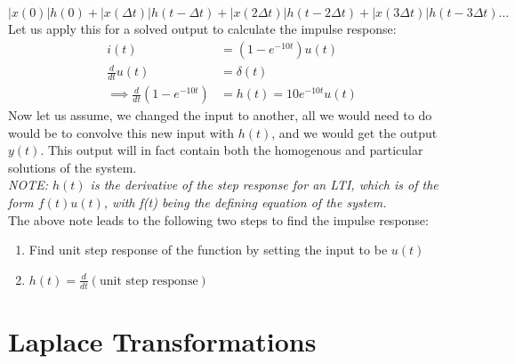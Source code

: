 \documentclass[nobib]{tufte-handout}
\begin{document}
\begin{equation*}
    |x(0)|h(0)+|x(\Delta t)|h(t-\Delta t)+|x(2\Delta t)|h(t-2\Delta t)+|x(3\Delta t)|h(t-3\Delta t)\ldots
\end{equation*}
Let us apply this for a solved output to calculate the impulse response:
\begin{align*}
    i(t)                              & = (1-e^{-10t})u(t)      \\
    \frac{d}{dt}u(t)                  & = \delta(t)             \\
    \implies \frac{d}{dt}(1-e^{-10t}) & = h(t) = 10e^{-10t}u(t)
\end{align*}
Now let us assume, we changed the input to another, all we would need to do would be to convolve this new input with $h(t)$, and we would get the output $y(t)$. This output will in fact contain both the homogenous and particular solutions of the system.\\
\textit{NOTE: $h(t)$ is the derivative of the step response for an LTI, which is of the form $f(t)u(t)$, with f(t) being the defining equation of the system.}\\
The above note leads to the following two steps to find the impulse response:
\begin{enumerate}
    \item Find unit step response of the function by setting the input to be $u(t)$
    \item $h(t) = \frac{d}{dt}(\text{unit step response})$
\end{enumerate}
\section{Laplace Transformations}
\end{document}
